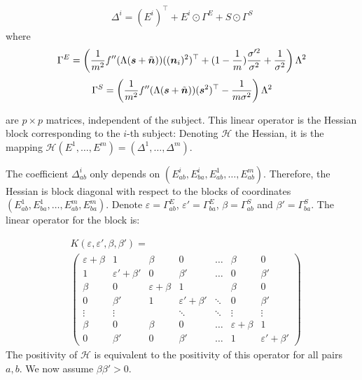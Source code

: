 \begin{align}
 \Delta^i = (E^i)^{\top} + E^i \odot\Gamma^E
 +S\odot \Gamma^S
\end{align}
where 
$$
\Gamma^E= \left(\frac1{m^2}f''(\Lambda(\boldsymbol{s} + \tilde{\boldsymbol{n}}))((\boldsymbol{n}_i)^2)^{\top} + (1-\frac1m)\frac{\sigma'^2}{\sigma^2} + \frac{1}{\sigma^2} \right)\Lambda^2
$$
$$
\Gamma^S =\left(\frac1{m^2}f''(\Lambda(\boldsymbol{s} + \tilde{\boldsymbol{n}}))(\boldsymbol{s}^2)^{\top} -\frac{1}{m\sigma^2}  \right)\Lambda^2
$$

are $p\times p$ matrices, independent of the subject.
This linear operator is the Hessian block corresponding to the $i$-th subject:
Denoting $\mathcal{H}$ the Hessian, it is the mapping $\mathcal{H}(E^1, \dots, E^m) = (\Delta^1, \dots, \Delta^m)$.

The coefficient $\Delta^i_{ab}$ only depends on $(E^i_{ab}, E^i_{ba}, E^1_{ab},\dots, E^m_{ab})$. Therefore, the Hessian is block diagonal with respect to the blocks of coordinates $(E^1_{ab}, E^1_{ba}, \dots, E^m_{ab}, E^m_{ba})$. Denote $\varepsilon = \Gamma^E_{ab}$, $\varepsilon' = \Gamma^E_{ba}$, $\beta = \Gamma^S_{ab}$ and $\beta'= \Gamma^S_{ba}$. The linear operator for the block is:

\begin{align*}
&K(\varepsilon, \varepsilon', \beta, \beta')= \\
&\left(
    \begin{array}{ll|ll|l|ll}
\varepsilon + \beta & 1       & \beta & 0       & \dots  & \beta & 0       \\
1      & \varepsilon' + \beta' & 0      & \beta' & \dots  & 0      & \beta' \\
\hline
\beta & 0       & \varepsilon + \beta & 1       &        & \beta & 0       \\
0      & \beta' & 1      & \varepsilon' + \beta' & \ddots & 0      & \beta' \\
\hline
\vdots & \vdots  &        & \ddots  & \ddots & \vdots & \vdots  \\
\hline
\beta & 0       & \beta & 0       & \dots  & \varepsilon + \beta & 1       \\
0      & \beta' & 0      & \beta' & \dots  & 1      & \varepsilon' + \beta'
    \end{array}
\right)
\end{align*}
The positivity of $\mathcal{H}$ is equivalent to the positivity of this operator for all pairs $a, b$.
We now assume $\beta \beta' > 0$.

